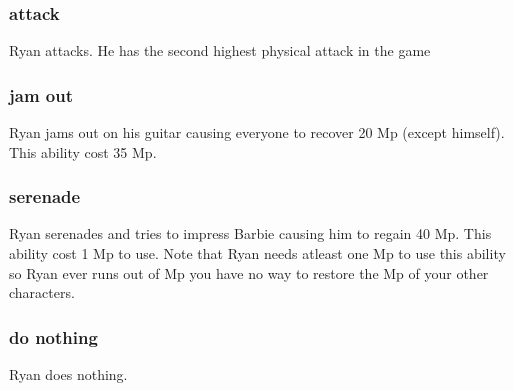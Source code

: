 \documentclass[a4paper]{article}
\begin{document}
\subsubsection{attack}
Ryan attacks. He has the second highest physical attack in the game
\subsubsection{jam out}
Ryan jams out on his guitar causing everyone to recover 20 Mp (except himself). This ability cost 35 Mp.
\subsubsection{serenade}
Ryan serenades and tries to impress Barbie causing him to regain 40 Mp. This ability cost 1 Mp to use. Note that Ryan needs atleast one Mp to use this ability so Ryan ever runs out of Mp you have no way to restore the Mp of your other characters. 
\subsubsection{do nothing}
Ryan does nothing.
\end{document}
